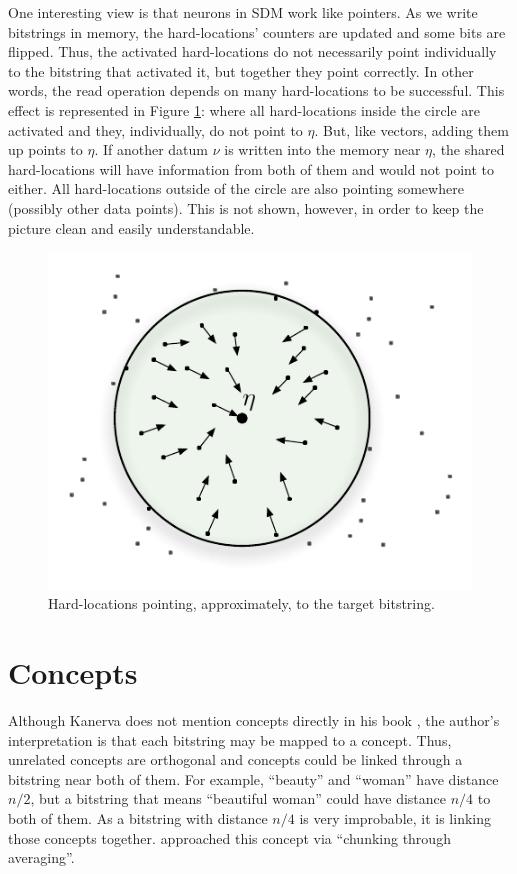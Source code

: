 One interesting view is that neurons in SDM work like pointers. As we write bitstrings in memory, the hard-locations' counters are updated and some bits are flipped. Thus, the activated hard-locations do not necessarily point individually to the bitstring that activated it, but together they point correctly. In other words, the read operation depends on many hard-locations to be successful. This effect is represented in Figure \ref{fig-p1-pointers}: where all hard-locations inside the circle are activated and they, individually, do not point to $\eta$.  But, like vectors, adding them up points to $\eta$. If another datum $\nu$ is written into the memory near $\eta$, the shared hard-locations will have information from both of them and would not point to either.  All hard-locations outside of the circle are also pointing somewhere (possibly other data points). This is not shown, however, in order to keep the picture clean and easily understandable.

\begin{figure}[h]
\centering\includegraphics[scale=0.75]{./images02/p1_after_write.pdf}

\caption{Hard-locations pointing, approximately, to the target bitstring.\label{fig-p1-pointers}}
\end{figure}



\section{Concepts}

Although Kanerva does not mention concepts directly in his book \citep{Kanerva1988}, the author's interpretation is that each bitstring may be mapped to a concept. Thus, unrelated concepts are orthogonal and concepts could be linked through a bitstring near both of them. For example, ``beauty'' and ``woman'' have distance $n/2$, but a bitstring that means ``beautiful woman'' could have distance $n/4$ to both of them. As a bitstring with distance $n/4$ is very improbable, it is linking those concepts together. \citet{Linhares2011} approached this concept via ``chunking through averaging''.

